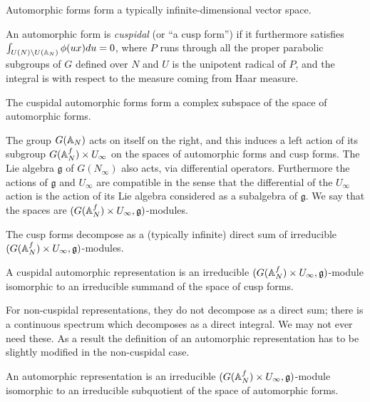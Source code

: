 Automorphic forms form a typically infinite-dimensional vector space. 

\begin{definition} An automorphic form is \emph{cuspidal} (or ``a cusp form'') if it furthermore satisfies $\int_{U(N)\backslash U(\mathbb{A}_N)}\phi(ux)du=0$, where $P$ runs through all the proper parabolic subgroups of $G$ defined over $N$ and $U$ is the unipotent radical of $P$, and the integral is with respect to the measure coming from Haar measure.
\end{definition}

The cuspidal automorphic forms form a complex subspace of the space of automorphic forms.

\begin{definition} The group $G(\mathbb{A}_N)$ acts on itself on the right, and this induces a left action of its
    subgroup $G(\mathbb{A}_N^f)\times U_\infty$ on the spaces of automorphic forms and cusp forms. The Lie algebra $\mathfrak{g}$ of $G(N_\infty)$ also acts, via differential operators. Furthermore the actions of $\mathfrak{g}$ and $U_\infty$ are compatible in the sense that the differential of the $U_\infty$ action is the action of its Lie algebra considered as a subalgebra of $\mathfrak{g}$. We say that the spaces are $(G(\mathbb{A}_N^f)\times U_\infty,\mathfrak{g})$-modules.
\end{definition}

\begin{theorem} The cusp forms decompose as a (typically infinite) direct sum of irreducible $(G(\mathbb{A}_N^f)\times U_\infty,\mathfrak{g})$-modules.
\end{theorem}
\begin{definition} A cuspidal automorphic representation is an irreducible $(G(\mathbb{A}_N^f)\times U_\infty,\mathfrak{g})$-module isomorphic to an irreducible summand of the space of cusp forms.
\end{definition}

For non-cuspidal representations, they do not decompose as a direct sum; there is a continuous spectrum which decomposes as a direct integral. We may not ever need these. As a result the definition of an automorphic representation has to be slightly modified in the non-cuspidal case.

\begin{definition} An automorphic representation is an irreducible $(G(\mathbb{A}_N^f)\times U_\infty,\mathfrak{g})$-module isomorphic to an irreducible subquotient of the space of automorphic forms.
\end{definition}

